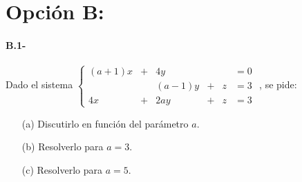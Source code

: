 \section*{Opción B:}
\begin{mybox}
    \paragraph{B.1-} Dado el sistema $\left \{ \begin{array}{cccccc}
     (a+1)x & + & 4y     &   &   &=0  \\
            &   & (a-1)y & + & z &=3\\
     4x     & + & 2ay    & + & z &=3       
    \end{array} \right .$ , se pide:
    \begin{enumerate}
        \item[(a)] Discutirlo en función del parámetro $a$.
        \item[(b)] Resolverlo para $a = 3$. 
        \item[(c)] Resolverlo para $a = 5$. 
    \end{enumerate}
\end{mybox}

